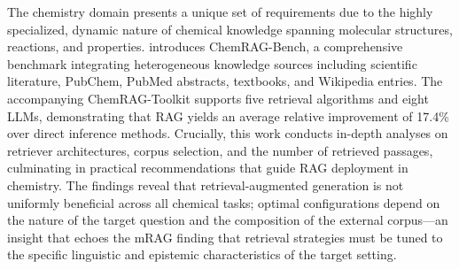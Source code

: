 \documentclass[11pt]{article}
\begin{document}
The chemistry domain presents a unique set of requirements due to the highly specialized, dynamic nature of chemical knowledge spanning molecular structures, reactions, and properties. \cite{ref400} introduces ChemRAG-Bench, a comprehensive benchmark integrating heterogeneous knowledge sources including scientific literature, PubChem, PubMed abstracts, textbooks, and Wikipedia entries. The accompanying ChemRAG-Toolkit supports five retrieval algorithms and eight LLMs, demonstrating that RAG yields an average relative improvement of 17.4\% over direct inference methods. Crucially, this work conducts in-depth analyses on retriever architectures, corpus selection, and the number of retrieved passages, culminating in practical recommendations that guide RAG deployment in chemistry. The findings reveal that retrieval-augmented generation is not uniformly beneficial across all chemical tasks; optimal configurations depend on the nature of the target question and the composition of the external corpus---an insight that echoes the mRAG finding that retrieval strategies must be tuned to the specific linguistic and epistemic characteristics of the target setting.
\end{document}
